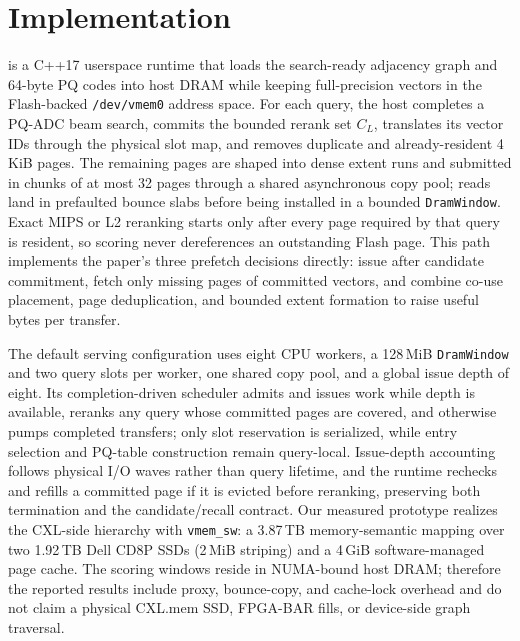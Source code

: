 \section{Implementation}
\label{sec:impl}

\sys{} is a C++17 userspace runtime that loads the search-ready adjacency graph and 64-byte PQ codes into host DRAM while keeping full-precision vectors in the Flash-backed \texttt{/dev/vmem0} address space. For each query, the host completes a PQ-ADC beam search, commits the bounded rerank set $C_L$, translates its vector IDs through the physical slot map, and removes duplicate and already-resident 4\,KiB pages. The remaining pages are shaped into dense extent runs and submitted in chunks of at most 32 pages through a shared asynchronous copy pool; reads land in prefaulted bounce slabs before being installed in a bounded \texttt{DramWindow}. Exact MIPS or L2 reranking starts only after every page required by that query is resident, so scoring never dereferences an outstanding Flash page. This path implements the paper's three prefetch decisions directly: issue after candidate commitment, fetch only missing pages of committed vectors, and combine co-use placement, page deduplication, and bounded extent formation to raise useful bytes per transfer.

The default serving configuration uses eight CPU workers, a 128\,MiB \texttt{DramWindow} and two query slots per worker, one shared copy pool, and a global issue depth of eight. Its completion-driven scheduler admits and issues work while depth is available, reranks any query whose committed pages are covered, and otherwise pumps completed transfers; only slot reservation is serialized, while entry selection and PQ-table construction remain query-local. Issue-depth accounting follows physical I/O waves rather than query lifetime, and the runtime rechecks and refills a committed page if it is evicted before reranking, preserving both termination and the candidate/recall contract. Our measured prototype realizes the CXL-side hierarchy with \texttt{vmem\_sw}: a 3.87\,TB memory-semantic mapping over two 1.92\,TB Dell CD8P SSDs (2\,MiB striping) and a 4\,GiB software-managed page cache. The scoring windows reside in NUMA-bound host DRAM; therefore the reported results include proxy, bounce-copy, and cache-lock overhead and do not claim a physical CXL.mem SSD, FPGA-BAR fills, or device-side graph traversal.
